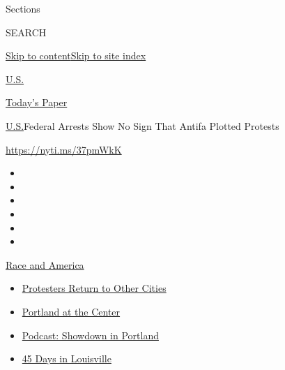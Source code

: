Sections

SEARCH

\protect\hyperlink{site-content}{Skip to
content}\protect\hyperlink{site-index}{Skip to site index}

\href{https://www.nytimes3xbfgragh.onion/section/us}{U.S.}

\href{https://myaccount.nytimes3xbfgragh.onion/auth/login?response_type=cookie\&client_id=vi}{}

\href{https://www.nytimes3xbfgragh.onion/section/todayspaper}{Today's
Paper}

\href{/section/us}{U.S.}\textbar{}Federal Arrests Show No Sign That
Antifa Plotted Protests

\url{https://nyti.ms/37pmWkK}

\begin{itemize}
\item
\item
\item
\item
\item
\item
\end{itemize}

\href{https://www.nytimes3xbfgragh.onion/news-event/george-floyd-protests-minneapolis-new-york-los-angeles?action=click\&pgtype=Article\&state=default\&region=TOP_BANNER\&context=storylines_menu}{Race
and America}

\begin{itemize}
\tightlist
\item
  \href{https://www.nytimes3xbfgragh.onion/2020/07/26/us/protests-portland-seattle-trump.html?action=click\&pgtype=Article\&state=default\&region=TOP_BANNER\&context=storylines_menu}{Protesters
  Return to Other Cities}
\item
  \href{https://www.nytimes3xbfgragh.onion/2020/07/24/us/portland-oregon-protests-white-race.html?action=click\&pgtype=Article\&state=default\&region=TOP_BANNER\&context=storylines_menu}{Portland
  at the Center}
\item
  \href{https://www.nytimes3xbfgragh.onion/2020/07/23/podcasts/the-daily/portland-protests.html?action=click\&pgtype=Article\&state=default\&region=TOP_BANNER\&context=storylines_menu}{Podcast:
  Showdown in Portland}
\item
  \href{https://www.nytimes3xbfgragh.onion/interactive/2020/07/16/us/black-lives-matter-protests-louisville-breonna-taylor.html?action=click\&pgtype=Article\&state=default\&region=TOP_BANNER\&context=storylines_menu}{45
  Days in Louisville}
\end{itemize}

